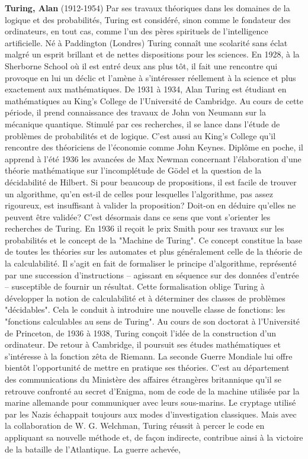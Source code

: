 \textbf{Turing, Alan} (1912-1954) Par ses travaux théoriques dans les domaines de la logique et des probabilités, Turing est considéré, sinon comme le fondateur des ordinateurs, en tout cas, comme l'un des pères spirituels de l'intelligence artificielle. Né à Paddington (Londres) Turing connaît une scolarité sans éclat malgré un esprit brillant et de nettes dispositions pour les sciences. En 1928, à la Sherborne School où il est entré deux ans plus tôt, il fait une rencontre qui provoque en lui un déclic et l'amène à s'intéresser réellement à la science et plus exactement aux mathématiques. De 1931 à 1934, Alan Turing est étudiant en mathématiques au King's College de l'Université de Cambridge. Au cours de cette période, il prend connaissance des travaux de John von Neumann sur la mécanique quantique. Stimulé par ces recherches, il se lance dans l'étude de problèmes de probabilités et de logique. C'est aussi au King's College qu'il rencontre des théoriciens de l'économie comme John Keynes. Diplôme en poche, il apprend à l'été 1936 les avancées de Max Newman concernant l'élaboration d'une théorie mathématique sur l'incomplétude de Gödel et la question de la décidabilité de Hilbert. Si pour beaucoup de propositions, il est facile de trouver un algorithme, qu'en est-il de celles pour lesquelles l'algorithme, pas assez rigoureux, est insuffisant à valider la proposition? Doit-on en déduire qu'elles ne peuvent être validée? C'est désormais dans ce sens que vont s'orienter les recherches de Turing. En 1936 il reçoit le prix Smith pour ses travaux sur les probabilités et le concept de la "Machine de Turing". Ce concept constitue la base de toutes les théories sur les automates et plus généralement celle de la théorie de la calculabilité. Il s'agit en fait de formaliser le principe d'algorithme, représenté par une succession d'instructions – agissant en séquence sur des données d'entrée – susceptible de fournir un résultat. Cette formalisation oblige Turing à développer la notion de calculabilité et à déterminer des classes de problèmes "décidables". Cela le conduit à introduire une nouvelle classe de fonctions: les "fonctions calculables au sens de Turing". Au cours de son doctorat à l'Université de Princeton, de 1936 à 1938, Turing conçoit l'idée de la construction d'un ordinateur. De retour à Cambridge, il poursuit ses études mathématiques et s'intéresse à la fonction zêta de Riemann. La seconde Guerre Mondiale lui offre bientôt l'opportunité de mettre en pratique ses théories. C'est au département des communications du Ministère des affaires étrangères britannique qu'il se retrouve confronté au secret d'Enigma, nom de code de la machine utilisée par la marine allemande pour communiquer avec leurs sous-marins. Le cryptage utilisé par les Nazis échappait toujours aux modes d'investigation classiques. Mais avec la collaboration de W. G. Welchman, Turing réussit à percer le code en appliquant sa nouvelle méthode et, de façon indirecte, contribue ainsi à la victoire de la bataille de l'Atlantique. La guerre achevée, 
